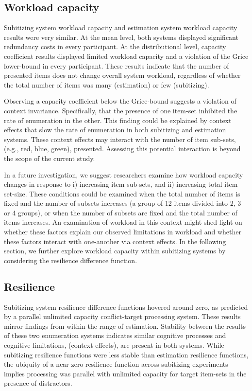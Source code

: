 \subsection{Workload capacity}
Subitizing system workload capacity and estimation system workload capacity results were very similar. At the mean level, both systems displayed significant redundancy costs in every participant. At the distributional level, capacity coefficient results displayed limited workload capacity and a violation of the Grice lower-bound in every participant. These results indicate that the number of presented items does not change overall system workload, regardless of whether the total number of items was many (estimation) or few (subitizing).

Observing a capacity coefficient below the Grice-bound suggests a violation of context invariance. Specifically, that the presence of one item-set inhibited the rate of enumeration in the other. This finding could be explained by context effects that slow the rate of enumeration in both subitizing and estimation systems. These context effects may interact with the number of item sub-sets, (e.g., red, blue, green), presented. Assessing this potential interaction is beyond the scope of the current study. 

In a future investigation, we suggest researchers examine how workload capacity changes in response to i) increasing item sub-sets, and ii) increasing total item set-size. These conditions could be examined when the total number of items is fixed and the number of subsets increases (a group of 12 items divided into 2, 3 or 4 groups), or when the number of subsets are fixed and the total number of items increases. An examination of workload in this context might shed light on whether these factors explain our observed limitations in workload and whether these factors interact with one-another via context effects. In the following section, we further explore workload capacity within subitizing systems by considering the resilience difference function.

\subsection{Resilience}
Subitizing system resilience difference functions hovered around zero, as predicted by a parallel unlimited capacity conflict-target processing system. These results mirror findings from within the range of estimation. Stability between the results of these two enumeration systems indicates similar cognitive processes and cognitive limitations, (\eg context effects), are present in both systems. While subitizing resilience functions were less stable than estimation resilience functions, the ubiquity of a near zero resilience function across subitizing experiments implies processing was parallel with unlimited capacity for target item-sets in the presence of distractors. 

